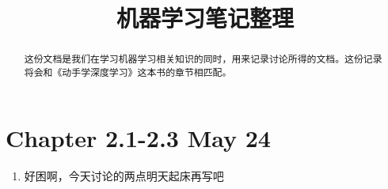\documentclass[a4paper]{article}
\title{ 机器学习笔记整理}
\begin{document}
\maketitle
\begin{abstract}
	这份文档是我们在学习机器学习相关知识的同时，用来记录讨论所得的文档。这份记录将会和《动手学深度学习》这本书的章节相匹配。
\end{abstract}
\section{Chapter 2.1-2.3 May 24}
\begin{enumerate}
	\item 好困啊，今天讨论的两点明天起床再写吧

\end{enumerate}
\end{document}
